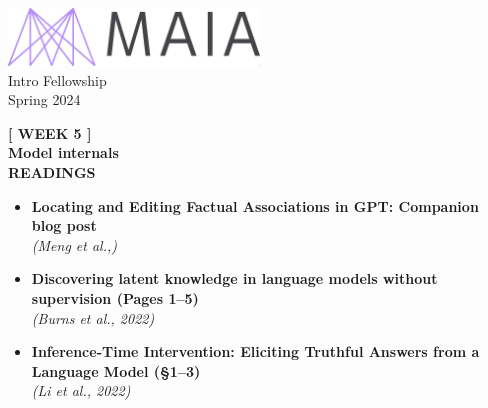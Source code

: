 \documentclass[12pt]{article}
\begin{document}
\thispagestyle{empty} %

\begin{center}
    \includegraphics[width=0.5\textwidth]{../00_assets/maia-horizontal_cropped.jpeg}\\
    {\large Intro Fellowship}\\
    \vspace{0.5em}
    Spring 2024
\end{center}

\vspace{2em}

\begin{center}
    \textbf{[ WEEK 5 ]}\\
    \vspace{0.7em}
    {\LARGE \textbf{Model internals}}\\
    \vspace{0.7em}
    \textbf{READINGS}
\end{center}

\vspace{2em}

\begin{center}
    \begin{minipage}{0.9\textwidth}
        \begin{itemize}
            \item \textbf{Locating and Editing Factual Associations in GPT: Companion blog post}\\
            \emph{(Meng et al.,)}

            \vspace{1em}
            \item \textbf{Discovering latent knowledge in language models without supervision (Pages 1--5)}\\
            \emph{(Burns et al., 2022)}

            \vspace{1em}
            \item \textbf{Inference-Time Intervention: Eliciting Truthful Answers from a Language Model (\S1--3)}\\
            \emph{(Li et al., 2022)}
        \end{itemize}
    \end{minipage}
\end{center}
\end{document}
